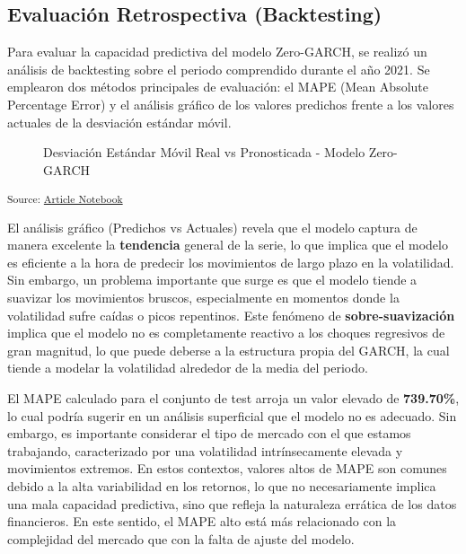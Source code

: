 \documentclass[
  number,
  preprint,
  3p,
  onecolumn]{elsarticle}
\begin{document}
\subsection{Evaluación Retrospectiva
(Backtesting)}\label{evaluaciuxf3n-retrospectiva-backtesting}

Para evaluar la capacidad predictiva del modelo Zero-GARCH, se realizó
un análisis de backtesting sobre el periodo comprendido durante el año
2021. Se emplearon dos métodos principales de evaluación: el MAPE (Mean
Absolute Percentage Error) y el análisis gráfico de los valores
predichos frente a los valores actuales de la desviación estándar móvil.

\begin{figure}[H]


\caption{\label{fig-predicted-vs-actual-backtest}Desviación Estándar
Móvil Real vs Pronosticada - Modelo Zero-GARCH}

\end{figure}%

\textsubscript{Source:
\href{https://iancont.github.io/fixed_income_garch/index-preview.html}{Article
Notebook}}

El análisis gráfico (Predichos vs Actuales) revela que el modelo captura
de manera excelente la \textbf{tendencia} general de la serie, lo que
implica que el modelo es eficiente a la hora de predecir los movimientos
de largo plazo en la volatilidad. Sin embargo, un problema importante
que surge es que el modelo tiende a suavizar los movimientos bruscos,
especialmente en momentos donde la volatilidad sufre caídas o picos
repentinos. Este fenómeno de \textbf{sobre-suavización} implica que el
modelo no es completamente reactivo a los choques regresivos de gran
magnitud, lo que puede deberse a la estructura propia del GARCH, la cual
tiende a modelar la volatilidad alrededor de la media del periodo.

El MAPE calculado para el conjunto de test arroja un valor elevado de
\textbf{739.70\%}, lo cual podría sugerir en un análisis superficial que
el modelo no es adecuado. Sin embargo, es importante considerar el tipo
de mercado con el que estamos trabajando, caracterizado por una
volatilidad intrínsecamente elevada y movimientos extremos. En estos
contextos, valores altos de MAPE son comunes debido a la alta
variabilidad en los retornos, lo que no necesariamente implica una mala
capacidad predictiva, sino que refleja la naturaleza errática de los
datos financieros. En este sentido, el MAPE alto está más relacionado
con la complejidad del mercado que con la falta de ajuste del modelo.
\end{document}

